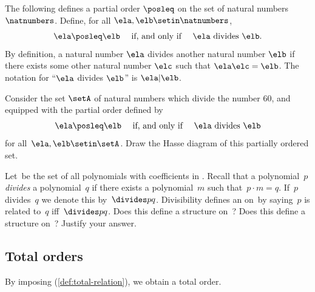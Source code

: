 
\begin{example}
    The following defines a partial order $\posleq$ on the set of natural numbers $\natnumbers$.
    Define, for all $\ela, \elb \setin \natnumbers$,
    \begin{equation}
        \ela \posleq \elb \quad \text{ if, and only if } \quad \ela \text{ divides } \elb.
    \end{equation}
    By definition, a natural number $\ela$ divides another natural number $\elb$ if there exists some other natural number $\elc$ such that $\ela \elc = \elb$.
    The notation for ``$\ela$ divides $\elb$'' is $\ela \vert \elb$.

\end{example}

\begin{gradedexercise}
    Consider the set $\setA$ of natural numbers which divide the number 60, and equipped with the partial order defined by
    \begin{equation}
        \ela \posleq \elb \quad \text{ if, and only if } \quad \ela \text{ divides } \elb
    \end{equation}
    for all~$\ela, \elb \setin \setA$.
    Draw the Hasse diagram of this partially ordered set.
\end{gradedexercise}

\begin{gradedexercise}
    \label{ex:PolynomialDivisibility}
    Let~\setA be the set of all polynomials with coefficients in \reals.
    Recall that a polynomial~$p$ \emph{divides} a polynomial~$q$ if there exists a polynomial~$m$ such that~$p \cdot m = q$.
    If~$p$ divides~$q$ we denote this by~$\divides p q$.
    Divisibility defines an  on~\setA by saying~$p$ is related to~$q$ iff~$\divides p q$.
    Does this define a  structure on~\setA?
    Does this define a  structure on~\setA?
    Justify your answer.
\end{gradedexercise}

\vfill

\subsection{Total orders}

\begin{marginfigure}
    \centering
    \caption{A total order.}
    \label{fig:tot_order_graph}
\end{marginfigure}
By imposing \emph{} (\cref{def:total-relation}), we obtain a total order.

